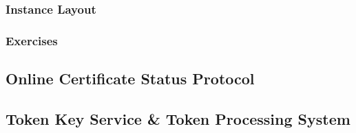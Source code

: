 \documentclass[a4paper]{article}
\begin{document}
\subsubsection{Instance Layout}
\subsubsection{Exercises}
\subsection{Online Certificate Status Protocol}
\subsection{Token Key Service \& Token Processing System}
\end{document}
